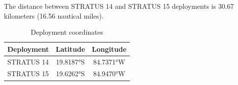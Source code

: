 
The distance between STRATUS 14 and STRATUS 15 deployments is 30.67 kilometers (16.56 nautical miles).

\begin{table}[ht]
\centering
\caption{Deployment coordinates}
\begin{tabular}{lcc}
\hline
\textbf{Deployment} & \textbf{Latitude} & \textbf{Longitude} \\
\hline
STRATUS 14 & 19.8187°S & 84.7371°W \\
STRATUS 15 & 19.6262°S & 84.9470°W \\
\hline
\end{tabular}
\end{table}
